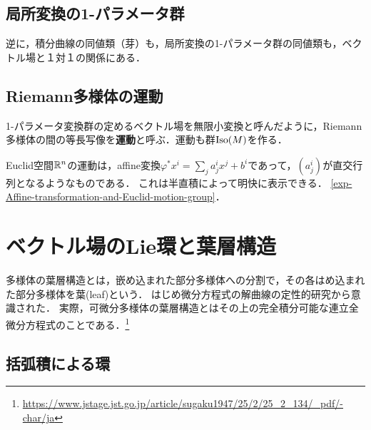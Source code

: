 \documentclass[uplatex,dvipdfmx]{jsreport}
\begin{document}
\subsection{局所変換の1-パラメータ群}

\begin{tcolorbox}[colframe=ForestGreen, colback=ForestGreen!10!white,breakable,colbacktitle=ForestGreen!40!white,coltitle=black,fonttitle=\bfseries\sffamily,
title=]
    逆に，積分曲線の同値類（芽）も，局所変換の1-パラメータ群の同値類も，ベクトル場と１対１の関係にある．
\end{tcolorbox}

\subsection{Riemann多様体の運動}

\begin{tcolorbox}[colframe=ForestGreen, colback=ForestGreen!10!white,breakable,colbacktitle=ForestGreen!40!white,coltitle=black,fonttitle=\bfseries\sffamily,
title=]
    1-パラメータ変換群の定めるベクトル場を無限小変換と呼んだように，Riemann多様体の間の等長写像を\textbf{運動}と呼ぶ．運動も群$\mathrm{Iso}(M)$を作る．
\end{tcolorbox}

\begin{theorem}
    Euclid空間$\mathbb{R}^n$の運動は，affine変換$\varphi^*x^i=\sum_ja^i_jx^j+b^i$であって，$(a^i_j)$が直交行列となるようなものである．
    これは半直積によって明快に表示できる．
    \ref{exp-Affine-transformation-and-Euclid-motion-group}．
\end{theorem}

\section{ベクトル場のLie環と葉層構造}

\begin{tcolorbox}[colframe=ForestGreen, colback=ForestGreen!10!white,breakable,colbacktitle=ForestGreen!40!white,coltitle=black,fonttitle=\bfseries\sffamily,
title=]
    多様体の葉層構造とは，嵌め込まれた部分多様体への分割で，その各はめ込まれた部分多様体を葉(leaf)という．
    はじめ微分方程式の解曲線の定性的研究から意識された．
    実際，可微分多様体の葉層構造とはその上の完全積分可能な連立全微分方程式のことである．\footnote{\url{https://www.jstage.jst.go.jp/article/sugaku1947/25/2/25_2_134/_pdf/-char/ja}}
\end{tcolorbox}

\subsection{括弧積による環}
\end{document}
